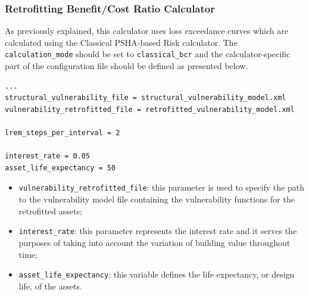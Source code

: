 \subsubsection{Retrofitting Benefit/Cost Ratio Calculator}
As previously explained, this calculator uses loss exceedance curves which are calculated using the Classical PSHA-based Risk calculator. The \Verb+calculation_mode+ should be set to \Verb+classical_bcr+ and the calculator-specific part of the configuration file should be defined as presented below.

\begin{Verbatim}[frame=single, commandchars=\\\{\}, samepage=true]
...
structural_vulnerability_file = structural_vulnerability_model.xml
vulnerability_retrofitted_file = retrofitted_vulnerability_model.xml

lrem_steps_per_interval = 2

interest_rate = 0.05
asset_life_expectancy = 50
\end{Verbatim}

\begin{itemize}
\item  \Verb+vulnerability_retrofitted_file+: this parameter is used to specify the path to the \gls{vulnerability model} file containing the \glspl{vulnerability function} for the retrofitted assets;
\item  \Verb+interest_rate+: this parameter represents the interest rate and it serves the purposes of taking into account the variation of building value throughout time;
\item  \Verb+asset_life_expectancy+: this variable defines the life expectancy, or design life, of the assets.
\end{itemize}